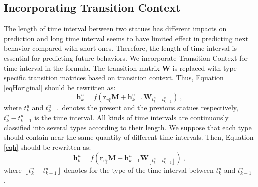 \documentclass{sig-alternate}
\begin{document}
\subsection{ Incorporating Transition Context}
The length of time interval between two statues has different impacts on prediction and long time interval seems to have limited effect in predicting next behavior compared with short ones. Therefore, the length of time interval is essential for predicting future behaviors. We incorporate Transition Context for time interval in the formula. The transition matrix $\textbf{W}$ is replaced with type-specific transition matrices based on transition context. Thus, Equation \eqref{eqHoriginal} should be rewritten as: 
\begin{equation}  \label{eqh}
\textbf{h}_{k}^{u}=f\left ( \textbf{r}_{v_{k}^{u}}\textbf{M}+\textbf{h}_{k-1}^{u}\textbf{W}_{ t_k^u-t_{k-1}^u  }\right )~,
\end{equation}
 where $t_k^u$ and $t_{k-1}^u$ denotes the present and the previous statues respectively, $t_k^u-t_{k-1}^u$ is the time interval.  All kinds of time intervals are continuously classified into several types according to their length. We suppose that each type should contain near the same quantity of different time intervals. Then, Equation \eqref{eqh} should be rewritten as: 
\begin{equation}  
\textbf{h}_{k}^{u}=f\left ( \textbf{r}_{v_{k}^{u}}\textbf{M}+\textbf{h}_{k-1}^{u}\textbf{W}_{\left\lfloor t_k^u-t_{k-1}^u \right\rfloor }\right )~,
\end{equation}
where $\left\lfloor t_k^u-t_{k-1}^u \right\rfloor$ denotes for the type of the time interval between $t_k^u$ and $t_{k-1}^u$ .
\end{document}
